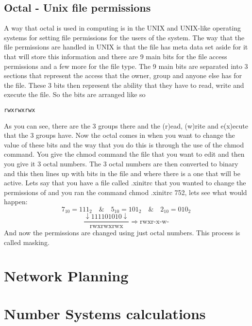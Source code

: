 \documentclass{article}
\begin{document}
\subsection{Octal - Unix file permissions}
A way that octal is used in computing is in the UNIX and UNIX-like operating systems for setting file permissions for the users of the system. The way that the file permissions are handled in UNIX is that the file has meta data set aside for it that will store this information and there are 9 main bits for the file access permissions and a few more for the file type. The 9 main bits are separated into 3 sections that represent the access that the owner, group and anyone else has for the file. These 3 bits then represent the ability that they have to read, write and execute the file. So the bits are arranged like so
\begin{verbatim}
rwxrwxrwx
\end{verbatim}
As you can see, there are the 3 groups there and the (r)ead, (w)rite and e(x)ecute that the 3 groups have. Now the octal comes in when you want to change the value of these bits and the way that you do this is through the use of the chmod command. You give the chmod command the file that you want to edit and then you give it 3 octal numbers. The 3 octal numbers are then converted to binary and this then lines up with bits in the file and where there is a one that will be active. Lets say that you have a file called .xinitrc that you wanted to change the permissions of and you ran the command chmod .xinitrc 752, lets see what would happen:
\[
	7_{10} = 111_{2} \quad \& \quad 5_{10} = 101_{2} \quad \& \quad 2_{10} = 010_{2}
\]
\[
	\frac{\downarrow111101010\downarrow}{\mbox{rwxrwxrwx}} \Rightarrow \mbox{rwxr-x-w-}
\]
And now the permissions are changed using just octal numbers. This process is called masking. 
\section{Network Planning}

\section{Number Systems calculations}
\end{document}

